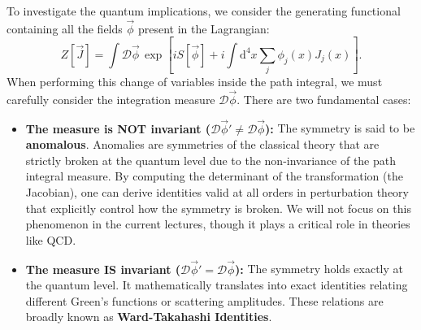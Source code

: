 To investigate the quantum implications, we consider the generating functional containing all the fields $\vec{\phi}$ present in the Lagrangian:
\[
    Z[\vec{J}] = \int \mathcal{D}\vec{\phi} \, \exp\left[ iS[\vec{\phi}] + i \int \mathrm{d}^4x \sum_j \phi_j(x) J_j(x) \right].
\]
When performing this change of variables inside the path integral, we must carefully consider the integration measure $\mathcal{D}\vec{\phi}$. There are two fundamental cases:
\begin{itemize}
    \item \textbf{The measure is NOT invariant ($\mathcal{D}\vec{\phi}' \neq \mathcal{D}\vec{\phi}$):} The symmetry is said to be \textbf{anomalous}. Anomalies are symmetries of the classical theory that are strictly broken at the quantum level due to the non-invariance of the path integral measure. By computing the determinant of the transformation (the Jacobian), one can derive identities valid at all orders in perturbation theory that explicitly control how the symmetry is broken. We will not focus on this phenomenon in the current lectures, though it plays a critical role in theories like QCD.
    \item \textbf{The measure IS invariant ($\mathcal{D}\vec{\phi}' = \mathcal{D}\vec{\phi}$):} The symmetry holds exactly at the quantum level. It mathematically translates into exact identities relating different Green's functions or scattering amplitudes. These relations are broadly known as \textbf{Ward-Takahashi Identities}.
\end{itemize}

